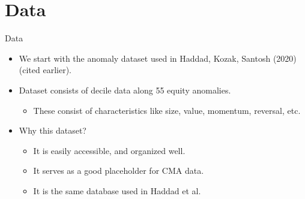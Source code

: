 \documentclass[dvipsnames,mathserif, handout]{beamer}
\begin{document}
{%


\section{Data}

\begin{frame}{Data}
	\begin{itemize}
		\item We start with the anomaly dataset used in Haddad, Kozak, Santosh (2020) (cited earlier). 
		\item Dataset consists of decile data along 55 equity anomalies.
		\begin{itemize}
			\item These consist of characteristics like size, value, momentum, reversal, etc.
		\end{itemize}
		\item Why this dataset? 
		\begin{itemize}
			\item It is easily accessible, and organized well.
			\item It serves as a good placeholder for CMA data.
			\item It is the same database used in Haddad et al. 
		\end{itemize}
	\end{itemize}
\end{frame}

}
\end{document}
